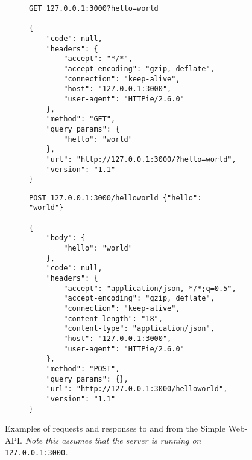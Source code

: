 \begin{figure}[H]
    \centering
    \begin{subfigure}{.5\textwidth}
        \centering
        \begin{mdframed}
            \begin{Verbatim}[fontsize=\scriptsize]
GET 127.0.0.1:3000?hello=world

{
    "code": null,
    "headers": {
        "accept": "*/*",
        "accept-encoding": "gzip, deflate",
        "connection": "keep-alive",
        "host": "127.0.0.1:3000",
        "user-agent": "HTTPie/2.6.0"
    },
    "method": "GET",
    "query_params": {
        "hello": "world"
    },
    "url": "http://127.0.0.1:3000/?hello=world",
    "version": "1.1"
}
            \end{Verbatim}
        \end{mdframed}
    \end{subfigure}%
    \begin{subfigure}{.5\textwidth}
        \centering
        \begin{mdframed}            
            \begin{Verbatim}[fontsize=\scriptsize]
POST 127.0.0.1:3000/helloworld {"hello": "world"}

{
    "body": {
        "hello": "world"
    },
    "code": null,
    "headers": {
        "accept": "application/json, */*;q=0.5",
        "accept-encoding": "gzip, deflate",
        "connection": "keep-alive",
        "content-length": "18",
        "content-type": "application/json",
        "host": "127.0.0.1:3000",
        "user-agent": "HTTPie/2.6.0"
    },
    "method": "POST",
    "query_params": {},
    "url": "http://127.0.0.1:3000/helloworld",
    "version": "1.1"
}
            \end{Verbatim}
        \end{mdframed}
    \end{subfigure}
    \cprotect\caption{\label{fig:1.2}Examples of requests and responses to and from the Simple Web-API. \textit{Note this assumes that the server is running on }\verb|127.0.0.1:3000|\textit{.}}
\end{figure}
